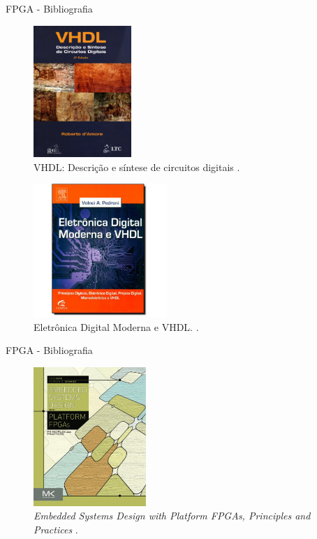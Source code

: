 \documentclass[aspectratio=169]{beamer}
\begin{document}
	\begin{frame}{FPGA - Bibliografia}
		\begin{multicols}{2}
			\begin{figure}[p]
				\centering
				\includegraphics[width=0.33\textwidth]{img/fpga/l4.png}
				\caption{VHDL: Descrição e síntese de circuitos digitais \cite{DAmore2005}.}
				\label{fig:l4}
			\end{figure}
			\columnbreak
			\begin{figure}[p]
				\centering
				\includegraphics[width=0.45\textwidth]{img/fpga/l5.jpg}
				\caption{Eletrônica Digital Moderna e VHDL.  \cite{PEDRONI2010}.}
				\label{fig:l5}
			\end{figure}
		\end{multicols}
	\end{frame}
	
	
	\begin{frame}{FPGA - Bibliografia}
		\begin{figure}[p]
			\centering
			\includegraphics[width=0.38\textwidth]{img/fpga/l6.png}
			\caption{\textit{Embedded Systems Design with Platform FPGAs,
				Principles and Practices} \cite{Sass2010} .}
			\label{fig:l6}
		\end{figure}
	\end{frame}
\end{document}
